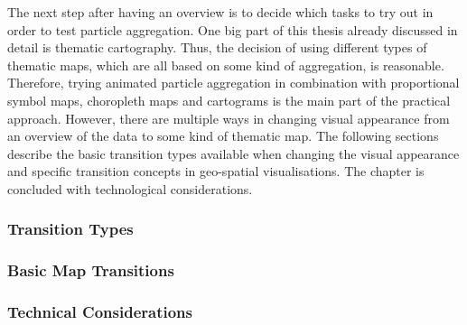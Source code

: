 \newpage
The next step after having an overview is to decide which tasks to try out in order to test particle aggregation. One big part of this thesis already discussed in detail is thematic cartography. Thus, the decision of using different types of thematic maps, which are all based on some kind of aggregation, is reasonable. Therefore, trying animated particle aggregation in combination with proportional symbol maps, choropleth maps and cartograms is the main part of the practical approach. However, there are multiple ways in changing visual appearance from an overview of the data to some kind of thematic map. The following sections describe the basic transition types available when changing the visual appearance and specific transition concepts in geo-spatial visualisations. The chapter is concluded with technological considerations.

\subsubsection{Transition Types}


\subsubsection{Basic Map Transitions}


\subsubsection{Technical Considerations}


